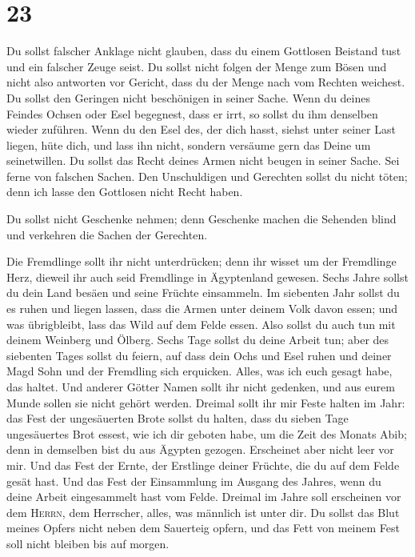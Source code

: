 \hypertarget{section-22}{%
\section{23}\label{section-22}}

 Du sollst falscher Anklage nicht glauben, dass du einem
Gottlosen Beistand tust und ein falscher Zeuge seist.  Du
sollst nicht folgen der Menge zum Bösen und nicht also antworten vor
Gericht, dass du der Menge nach vom Rechten weichest.  Du
sollst den Geringen nicht beschönigen in seiner Sache. 
Wenn du deines Feindes Ochsen oder Esel begegnest, dass er irrt, so
sollst du ihm denselben wieder zuführen.  Wenn du den Esel
des, der dich hasst, siehst unter seiner Last liegen, hüte dich, und
lass ihn nicht, sondern versäume gern das Deine um seinetwillen.
 Du sollst das Recht deines Armen nicht beugen in seiner
Sache.  Sei ferne von falschen Sachen. Den Unschuldigen
und Gerechten sollst du nicht töten; denn ich lasse den Gottlosen nicht
Recht haben.

 Du sollst nicht Geschenke nehmen; denn Geschenke machen
die Sehenden blind und verkehren die Sachen der Gerechten.

 Die Fremdlinge sollt ihr nicht unterdrücken; denn ihr
wisset um der Fremdlinge Herz, dieweil ihr auch seid Fremdlinge in
Ägyptenland gewesen.  Sechs Jahre sollst du dein Land
besäen und seine Früchte einsammeln.  Im siebenten Jahr
sollst du es ruhen und liegen lassen, dass die Armen unter deinem Volk
davon essen; und was übrigbleibt, lass das Wild auf dem Felde essen.
Also sollst du auch tun mit deinem Weinberg und Ölberg. 
Sechs Tage sollst du deine Arbeit tun; aber des siebenten Tages sollst
du feiern, auf dass dein Ochs und Esel ruhen und deiner Magd Sohn und
der Fremdling sich erquicken.  Alles, was ich euch gesagt
habe, das haltet. Und anderer Götter Namen sollt ihr nicht gedenken, und
aus eurem Munde sollen sie nicht gehört werden.  Dreimal
sollt ihr mir Feste halten im Jahr:  das Fest der
ungesäuerten Brote sollst du halten, dass du sieben Tage ungesäuertes
Brot essest, wie ich dir geboten habe, um die Zeit des Monats Abib; denn
in demselben bist du aus Ägypten gezogen. Erscheinet aber nicht leer vor
mir.  Und das Fest der Ernte, der Erstlinge deiner
Früchte, die du auf dem Felde gesät hast. Und das Fest der Einsammlung
im Ausgang des Jahres, wenn du deine Arbeit eingesammelt hast vom Felde.
 Dreimal im Jahre soll erscheinen vor dem \textsc{Herrn},
dem Herrscher, alles, was männlich ist unter dir.  Du
sollst das Blut meines Opfers nicht neben dem Sauerteig opfern, und das
Fett von meinem Fest soll nicht bleiben bis auf morgen.

